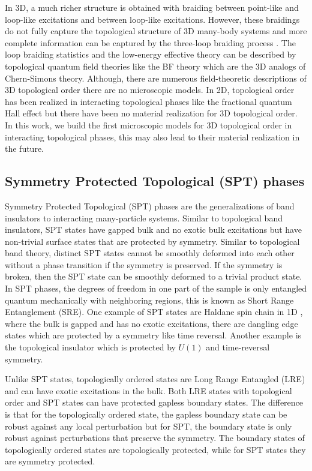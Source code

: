 In 3D, a much richer structure is obtained with braiding between point-like and loop-like excitations and between loop-like excitations. However, these braidings do not fully capture the topological structure of 3D many-body systems and more complete information can be captured by the three-loop braiding process \cite{WangLevin14}. The loop braiding statistics and the low-energy effective theory can be described by topological quantum field theories like the BF theory which are the 3D analogs of Chern-Simons theory. Although, there are numerous field-theoretic descriptions of 3D topological order there are no microscopic models. In 2D, topological order has been realized in interacting topological phases like the fractional quantum Hall effect but there have been no material realization for 3D topological order. In this work, we build the first microscopic models for 3D topological order in interacting topological phases, this may also lead to their material realization in the future.   

\subsection{Symmetry Protected Topological (SPT) phases}
Symmetry Protected Topological (SPT) phases are the generalizations of band insulators to interacting many-particle systems. Similar to topological band insulators, SPT states have gapped bulk and no exotic bulk excitations but have non-trivial surface states that are protected by symmetry. Similar to topological band theory, distinct SPT states cannot be smoothly deformed into each other without a phase transition if the symmetry is preserved. If the symmetry is broken, then the SPT state can be smoothly deformed to a trivial product state. In SPT phases, the degrees of freedom in one part of the sample is only entangled quantum mechanically with neighboring regions, this is known as Short Range Entanglement (SRE). One example of SPT states are Haldane spin chain in 1D \cite{Haldanespinchain,AKLT}, where the bulk is gapped and has no exotic excitations, there are dangling edge states which are protected by a symmetry like time reversal. Another example is the topological insulator which is protected by $U(1)$ and time-reversal symmetry. 

Unlike SPT states, topologically ordered states are Long Range Entangled (LRE) and can have exotic excitations in the bulk. Both LRE states with topological order and SPT states can have protected gapless boundary states. The difference is that for the topologically ordered state, the gapless boundary state can be robust against any local perturbation but for SPT, the boundary state is only robust against perturbations that preserve the symmetry. The boundary states of topologically ordered states are topologically protected, while for SPT states they are symmetry protected. 


